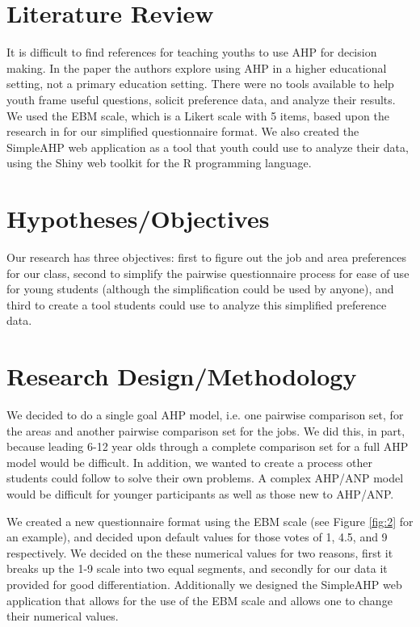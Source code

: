 \documentclass[11pt]{article}
\begin{document}
\section{Literature Review}
It is difficult to find references for teaching youths to use AHP for
decision making.  In the paper \citep{ref1} the authors explore
using AHP in a higher educational setting, not a primary education setting.
There were no tools available to help youth frame useful questions, solicit
preference data, and analyze their results.  
We used the EBM scale, which is a Likert scale with 5 items, based upon
the research in \citep{matell1971there} for our simplified questionnaire format.
We also created the SimpleAHP web application as a tool that youth
could use to analyze their data, using the Shiny \citep{shiny} web toolkit
for the R \citep{R} programming language.

\section{Hypotheses/Objectives}
Our research has three objectives: first to figure out the job and area
preferences for our class, second to simplify the pairwise 
questionnaire process for ease of use for young students (although
the simplification could be used by anyone), and third to create a tool students
could use to analyze this simplified preference data.



\section{Research Design/Methodology}
We decided to do a single goal AHP model, i.e. one pairwise comparison set,
for the areas and another pairwise comparison set for the jobs.  We did this, in part, because
leading 6-12 year olds through a complete comparison set for a full AHP model would be
difficult.  In addition, we wanted to create a process other students could follow to
solve their own problems.   A complex AHP/ANP model would be difficult for younger participants
as well as those new to AHP/ANP.

We created a new questionnaire format using the EBM scale (see Figure \ref{fig:2}
for an example), and
decided upon default values for those votes of 1, 4.5, and 9 respectively.  We decided 
on the these numerical values for two reasons, first it breaks up the 1-9 scale into two equal
segments, and secondly for our data it provided for good differentiation.  Additionally we
designed the SimpleAHP web application that allows for the use of the EBM scale and
allows one to change their numerical values.
\end{document}
